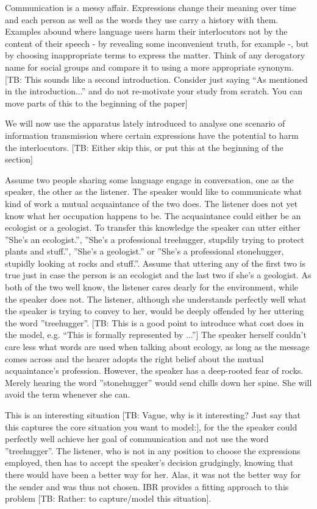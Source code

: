 \documentclass[10pt]{article}
\newcommand{\tb}[1]{\textcolor[rgb]{.8,.33,.0}{[TB: #1]}}%
\begin{document}
Communication is a messy affair. Expressions change their meaning over time and each person as well as the words they use carry a history with them. Examples abound where language users harm their interlocutors not by the content of their speech - by revealing some inconvenient truth, for example -, but by choosing inappropriate terms to express the matter. Think of any derogatory name for social groups and compare it to using a more appropriate synonym. \tb{This sounds like a second introduction. Consider just saying ``As mentioned in the introduction...'' and do not re-motivate your study from scratch. You can move parts of this to the beginning of the paper} %

We will now use the apparatus lately introduced to analyse one scenario of information transmission where certain expressions have the potential to harm the interlocutors. \tb{Either skip this, or put this at the beginning of the section}

Assume two people sharing some language engage in conversation, one as the speaker, the other as the listener. The speaker would like to communicate what kind of work a mutual acquaintance of the two does. The listener does not yet know what her occupation happens to be. The acquaintance could either be an ecologist or a geologist. To transfer this knowledge the speaker can utter either ''She's an ecologist.'', ''She's a professional treehugger, stupdily trying to protect plants and stuff.'', ''She's a geologist.'' or ''She's a professional stonehugger, stupidly looking at rocks and stuff.''. Assume that uttering any of the first two is true just in case the person is an ecologist and the last two if she's a geologist. As both of the two well know, the listener cares dearly for the environment, while the speaker does not. The listener, although she understands perfectly well what the speaker is trying to convey to her, would be deeply offended by her uttering the word ''treehugger''. \tb{This is a good point to introduce what cost does in the model, e.g. ``This is formally represented by ...''} The speaker herself couldn't care less what words are used when talking about ecology, as long as the message comes across and the hearer adopts the right belief about the mutual acquaintance's profession. However, the speaker has a deep-rooted fear of rocks. Merely hearing the word ''stonehugger'' would send chills down her spine. She will avoid the term whenever she can.

This is an interesting situation \tb{Vague, why is it interesting? Just say that this captures the core situation you want to model:}, for the the speaker could perfectly well achieve her goal of communication and not use the word ''treehugger''. The listener, who is not in any position to choose the expressions employed, then has to accept the speaker's decision grudgingly, knowing that there would have been a better way for her. Alas, it was not the better way for the sender and was thus not chosen. IBR provides a fitting approach to this problem \tb{Rather: to capture/model this situation}.
\end{document}
